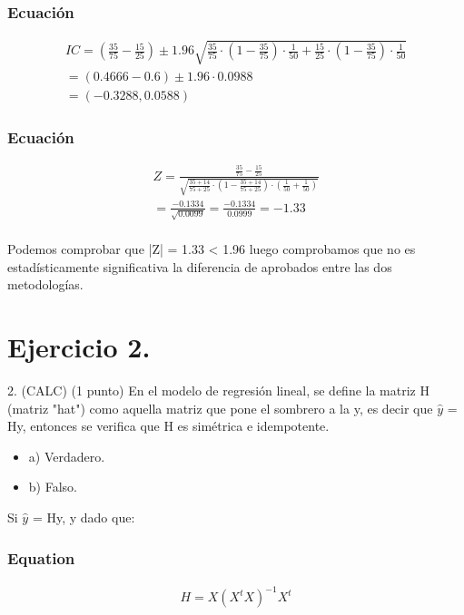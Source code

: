 \documentclass[12pt,spanish]{article}
\begin{document}
	
	\section*{Ecuación}			
	\begin{equation}
	\begin{aligned}
	IC = (\frac{35}{75}-\frac{15}{25}) \pm 1.96	 \sqrt{\frac{35}{75} \cdot (1-\frac{35}{75}) \cdot \frac{1}{50}+\frac{15}{25} \cdot (1-\frac{35}{75}) \cdot \frac{1}{50}}\\
	= (0.4666 - 0.6) \pm 1.96	 \cdot 0.0988 \\= (-0.3288, 0.0588)
	\end{aligned}
	\end{equation}
	
	
	\section*{Ecuación}			
	\begin{equation}
	\begin{aligned}
	Z = \frac{\frac{35}{75}-\frac{15}{25}}{\sqrt{\frac{35+14}{75+25} \cdot (1-\frac{35+14}{75+25}) \cdot (\frac{1}{50}+\frac{1}{50}) }}\\
	= \frac{ -0.1334}{\sqrt{0.0099}} = \frac{ -0.1334}{0.0999} = -1.33
	\end{aligned}
	\end{equation}
	\\
	Podemos comprobar que |Z| = 1.33 < 1.96 luego comprobamos que no es estadísticamente significativa la diferencia de aprobados entre las dos metodologías.
	
	
	\part*{Ejercicio 2.}	
	2. (CALC) (1 punto) En el modelo de regresión lineal, se define la matriz H (matriz "hat") como aquella matriz que pone el sombrero a la y, es decir que $\hat{y}$ = Hy, entonces se verifica que H es simétrica e idempotente.\\
	
	\begin{itemize}
		\item a) Verdadero.
		\item b) Falso.
	\end{itemize}
	
	Si $\hat{y}$ = Hy, y dado que:
	
	
	\section*{Equation}			
	\begin{equation}
	\begin{aligned}
	H =  X (X^t X)^{-1}  X^t
	\end{aligned}
	\end{equation}
	
\end{document}
